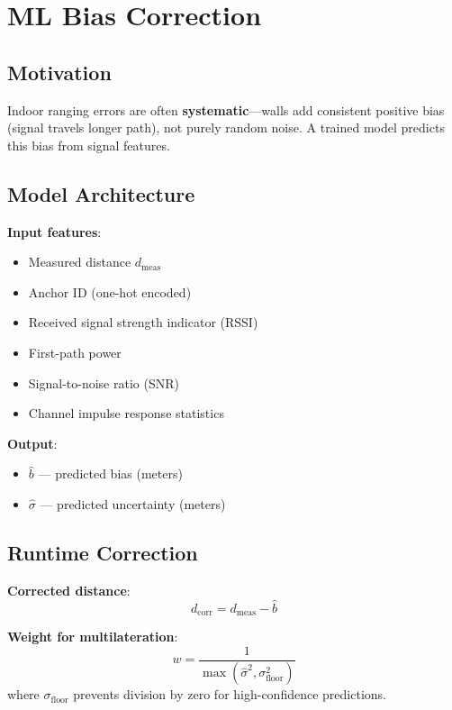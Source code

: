 \documentclass[11pt,a4paper]{article}
\begin{document}
\section{ML Bias Correction}

\subsection{Motivation}

Indoor ranging errors are often \textbf{systematic}---walls add consistent positive bias (signal travels longer path), not purely random noise. A trained model predicts this bias from signal features.

\subsection{Model Architecture}

\textbf{Input features}:
\begin{itemize}
    \item Measured distance $d_{\text{meas}}$
    \item Anchor ID (one-hot encoded)
    \item Received signal strength indicator (RSSI)
    \item First-path power
    \item Signal-to-noise ratio (SNR)
    \item Channel impulse response statistics
\end{itemize}

\textbf{Output}:
\begin{itemize}
    \item $\hat{b}$ --- predicted bias (meters)
    \item $\hat{\sigma}$ --- predicted uncertainty (meters)
\end{itemize}

\subsection{Runtime Correction}

\begin{mathbox}
\textbf{Corrected distance}:
\begin{equation}
    d_{\text{corr}} = d_{\text{meas}} - \hat{b}
\end{equation}

\textbf{Weight for multilateration}:
\begin{equation}
    w = \frac{1}{\max(\hat{\sigma}^2, \sigma_{\text{floor}}^2)}
\end{equation}
where $\sigma_{\text{floor}}$ prevents division by zero for high-confidence predictions.
\end{mathbox}
\end{document}
